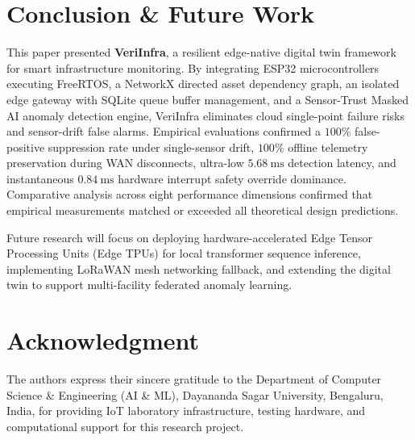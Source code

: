 \documentclass[conference]{IEEEtran}
\begin{document}
\section{Conclusion \& Future Work}
\label{sec:conclusion}
This paper presented \textbf{VeriInfra}, a resilient edge-native digital twin framework for smart infrastructure monitoring. By integrating ESP32 microcontrollers executing FreeRTOS, a NetworkX directed asset dependency graph, an isolated edge gateway with SQLite queue buffer management, and a Sensor-Trust Masked AI anomaly detection engine, VeriInfra eliminates cloud single-point failure risks and sensor-drift false alarms. Empirical evaluations confirmed a $100\%$ false-positive suppression rate under single-sensor drift, $100\%$ offline telemetry preservation during WAN disconnects, ultra-low $5.68~\text{ms}$ detection latency, and instantaneous $0.84~\text{ms}$ hardware interrupt safety override dominance. Comparative analysis across eight performance dimensions confirmed that empirical measurements matched or exceeded all theoretical design predictions.

Future research will focus on deploying hardware-accelerated Edge Tensor Processing Units (Edge TPUs) for local transformer sequence inference, implementing LoRaWAN mesh networking fallback, and extending the digital twin to support multi-facility federated anomaly learning.

\section*{Acknowledgment}
The authors express their sincere gratitude to the Department of Computer Science \& Engineering (AI \& ML), Dayananda Sagar University, Bengaluru, India, for providing IoT laboratory infrastructure, testing hardware, and computational support for this research project.
\end{document}
